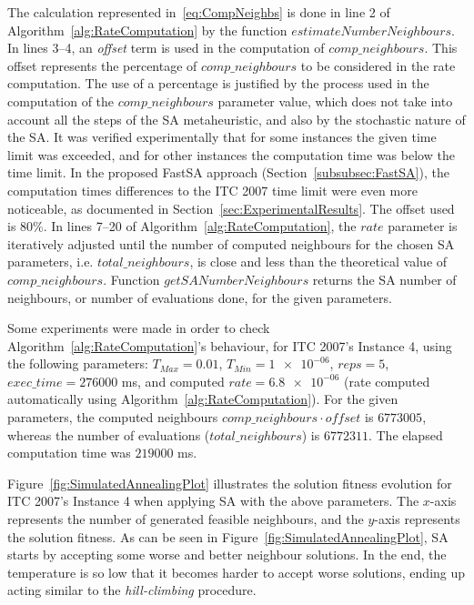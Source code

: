 The calculation represented in~\eqref{eq:CompNeighbs} is done in line 2 of Algorithm~\ref{alg:RateComputation} by the function $estimateNumberNeighbours$. In lines 3--4, an \textit{offset} term is used in the computation of $comp\_neighbours$. This offset represents the percentage of $comp\_neighbours$ to be considered in the rate computation. The use of a percentage is justified by the process used in the computation of the $comp\_neighbours$ parameter value, which does not take into account all the steps of the SA metaheuristic, and also by the stochastic nature of the SA. It was verified experimentally that for some instances the given time limit was exceeded, and for other instances the computation time was below the time limit. In the proposed FastSA approach (Section~\ref{subsubsec:FastSA}), the computation times differences to the ITC 2007 time limit were even more noticeable, as documented in Section~\ref{sec:ExperimentalResults}. The offset used is 80\%. In lines 7--20 of Algorithm~\ref{alg:RateComputation}, the $rate$ parameter is iteratively adjusted until the number of computed neighbours for the chosen SA parameters, i.e. $total\_neighbours$, is close and less than the theoretical value of $comp\_neighbours$. Function $getSANumberNeighbours$ returns the SA number of neighbours, or number of evaluations done, for the given parameters.

Some experiments were made in order to check Algorithm~\ref{alg:RateComputation}'s behaviour, for ITC 2007's Instance 4, using the following parameters: $T_{Max} = 0.01$, $T_{Min} = \num{1e-06}$, $reps = 5$, $exec\_time = \num{276000}$ ms, and computed $rate = \num{6.8e-06}$ (rate computed automatically using Algorithm~\ref{alg:RateComputation}). For the given parameters, the computed neighbours $comp\_neighbours \cdot offset$ is $\num{6773005}$, whereas the number of evaluations ($total\_neighbours$) is $\num{6772311}$. The elapsed computation time was $\num{219000}$ ms. 

Figure~\ref{fig:SimulatedAnnealingPlot} illustrates the solution fitness evolution for ITC 2007's Instance 4 when applying SA with the above parameters. The $x$-axis represents the number of generated feasible neighbours, and the $y$-axis represents the solution fitness. As can be seen in Figure~\ref{fig:SimulatedAnnealingPlot}, SA starts by accepting some worse and better neighbour solutions. In the end, the temperature is so low that it becomes harder to accept worse solutions, ending up acting similar to the \textit{hill-climbing} procedure. 


